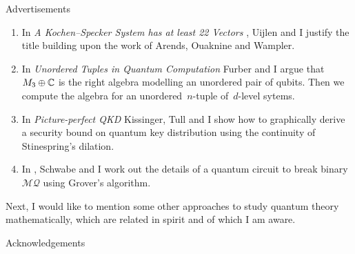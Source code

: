 \documentclass[b]{subfiles}
\begin{document}
\begin{parsec}
\begin{point}{Advertisements}
\begin{enumerate}
    \item In \emph{A Kochen--Specker System has at least 22 Vectors} \cite{uijlen2016kochen},
        Uijlen and I justify the title building upon the work
        of Arends, Ouaknine and Wampler.
\item 
    In \emph{Unordered Tuples in Quantum Computation} \cite{bags}
        Furber and I argue that~$M_3 \oplus \mathbb{C}$ is the right algebra
        modelling an unordered pair of qubits.  Then we compute
        the algebra for an unordered~$n$-tuple of~$d$-level sytems.
\item
    In \emph{Picture-perfect QKD} \cite{kissinger2017picture}
        Kissinger, Tull and I show how to graphically derive a security
        bound on quantum key distribution using the continuity of Stinespring's dilation.
\item
    In \cite{schwabe2016solving}, Schwabe and I
            work out the details of a quantum circuit
            to break binary~$\mathcal{MQ}$ using Grover's algorithm.
\end{enumerate}
Next, I would like to mention some other approaches
        to study quantum theory mathematically,
        which are related in spirit and of which I am aware.
% 
\end{point}
\begin{point}{Acknowledgements}%
    
\end{point}
\end{parsec}
\end{document}
